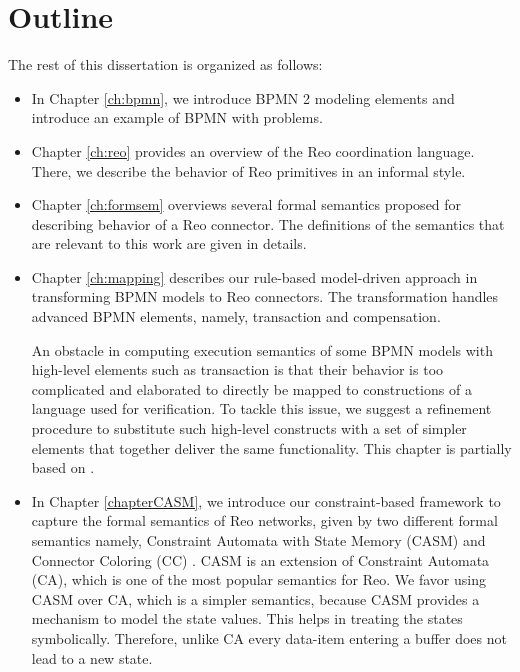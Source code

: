 \section{Outline}
The rest of this dissertation is organized as follows:

\begin{itemize}
\item In Chapter \ref{ch:bpmn}, we introduce BPMN 2 modeling elements and introduce an example of BPMN with problems. 

\item Chapter \ref{ch:reo} provides an overview of the Reo coordination language. There, we describe the behavior of Reo primitives in an informal style.

\item Chapter \ref{ch:formsem} overviews several formal semantics proposed for describing behavior of a Reo connector. The definitions of the semantics that are relevant to this work are given in details.

\item Chapter \ref{ch:mapping} describes our rule-based model-driven approach in transforming BPMN models to Reo connectors. %
The transformation handles advanced BPMN elements, namely, transaction and compensation. 

An obstacle in computing execution semantics of some BPMN models with high-level elements such as transaction is that their behavior is too complicated and elaborated to directly be mapped to constructions of a language used for verification. To tackle this issue, we suggest a refinement procedure to substitute such high-level constructs with a set of simpler elements that together deliver the same functionality. %
This chapter is partially based on \cite{behnaz}.
 
\item In Chapter \ref{chapterCASM}, we introduce our constraint-based framework to capture the formal semantics of Reo networks, given by two different formal semantics namely, Constraint Automata with State Memory (CASM) and Connector Coloring (CC) \cite{coloring}. CASM is an extension of Constraint Automata (CA), which is one of the most popular semantics for Reo. We favor using CASM over CA, which is a simpler semantics, because CASM provides a mechanism to model the state values. This helps in treating the states symbolically. Therefore, unlike CA every data-item entering a buffer does not lead to a new state. %


\end{itemize}
